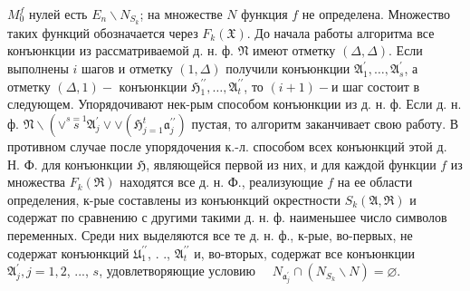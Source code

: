 \documentclass[10pt]{article}
\begin{document}
$M_{0}^{f}$ нулей есть $E_{n} \backslash N_{S_{k}}$; на множестве $N$ функция $f$ не определена. Множество таких функций обозначается через $F_{k}(\mathfrak{X})$. До начала работы алгоритма все конъюнкции из рассматриваемой д. н. ф. $\mathfrak{N}$ имеют отметку $(\Delta, \Delta)$. Если выполнены $i$ шагов и отметку $(1, \Delta)$ получили конъюнкции $\mathfrak{A}_{1}^{\prime}, \ldots, \mathfrak{A}_{s}^{\prime}$, а отметку $(\Delta, 1)-$ конъюнкции $\mathfrak{H}_{1}^{\prime \prime}, \ldots, \mathfrak{A}_{t}^{\prime \prime}$, то $(i+1)-\mathbf{и}$ шаг состоит в следующем. Упорядочивают нек-рым способом конъюнкции из д. н. ф. Если д. н. ф. $\mathfrak{N} \backslash\left(\vee \stackrel{s=1}{s} \mathfrak{A}_{j}^{\prime} \vee \vee\left(\mathfrak{H}_{j=1}^{t} \mathfrak{a}_{j}^{\prime \prime}\right)\right.$ пустая, то алгоритм заканчивает свою работу. В противном случае после упорядочения к.-л. способом всех конъюнкций этой д. Н. Ф. для конъюнкции $\mathfrak{H}$, являющейся первой из них, и для каждой функции $f$ из множества $F_{k}(\mathfrak{\Re})$ находятся все д. н. Ф., реализующие $f$ на ее области определения, к-рые составлены из конъюнкций окрестности $S_{k}(\mathfrak{A}, \mathfrak{\Re})$ и содержат по сравнению с другими такими д. н. ф. наименьшее число символов переменных. Среди них выделяются все те д. н. ф., к-рые, во-первых, не содержат конъюнкций $\mathfrak{U}_{1}^{\prime \prime}$, . ., $\mathfrak{A}_{t}^{\prime \prime}$ и, во-вторых, содержат все конъюнкции $\mathfrak{A}_{j}^{\prime}, j=1,2$, ..., $s$, удовлетворяющие условию $\quad N_{\mathfrak{a}_{j}^{\prime}} \cap\left(N_{S_{k}} \backslash N\right)=\varnothing$.
\end{document}
